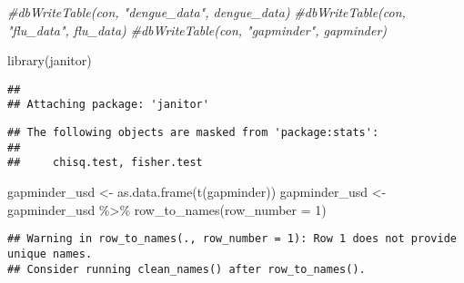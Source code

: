 \documentclass[
]{book}
\newenvironment{Shaded}{\begin{snugshade}}{\end{snugshade}}
\newcommand{\AttributeTok}[1]{\textcolor[rgb]{0.77,0.63,0.00}{#1}}
\newcommand{\CommentTok}[1]{\textcolor[rgb]{0.56,0.35,0.01}{\textit{#1}}}
\newcommand{\DecValTok}[1]{\textcolor[rgb]{0.00,0.00,0.81}{#1}}
\newcommand{\FunctionTok}[1]{\textcolor[rgb]{0.00,0.00,0.00}{#1}}
\newcommand{\NormalTok}[1]{#1}
\newcommand{\OtherTok}[1]{\textcolor[rgb]{0.56,0.35,0.01}{#1}}
\newcommand{\SpecialCharTok}[1]{\textcolor[rgb]{0.00,0.00,0.00}{#1}}
\begin{document}
\begin{Shaded}
\begin{Highlighting}[]
\CommentTok{\#dbWriteTable(con, "dengue\_data", dengue\_data)}
\CommentTok{\#dbWriteTable(con, "flu\_data", flu\_data)}
\CommentTok{\#dbWriteTable(con, "gapminder", gapminder)}

\FunctionTok{library}\NormalTok{(janitor)}
\end{Highlighting}
\end{Shaded}

\begin{verbatim}
## 
## Attaching package: 'janitor'
\end{verbatim}

\begin{verbatim}
## The following objects are masked from 'package:stats':
## 
##     chisq.test, fisher.test
\end{verbatim}

\begin{Shaded}
\begin{Highlighting}[]
\NormalTok{gapminder\_usd }\OtherTok{\textless{}{-}} \FunctionTok{as.data.frame}\NormalTok{(}\FunctionTok{t}\NormalTok{(gapminder))}
\NormalTok{gapminder\_usd }\OtherTok{\textless{}{-}}\NormalTok{ gapminder\_usd }\SpecialCharTok{\%\textgreater{}\%} \FunctionTok{row\_to\_names}\NormalTok{(}\AttributeTok{row\_number =} \DecValTok{1}\NormalTok{)}
\end{Highlighting}
\end{Shaded}

\begin{verbatim}
## Warning in row_to_names(., row_number = 1): Row 1 does not provide unique names.
## Consider running clean_names() after row_to_names().
\end{verbatim}

  
\end{document}
